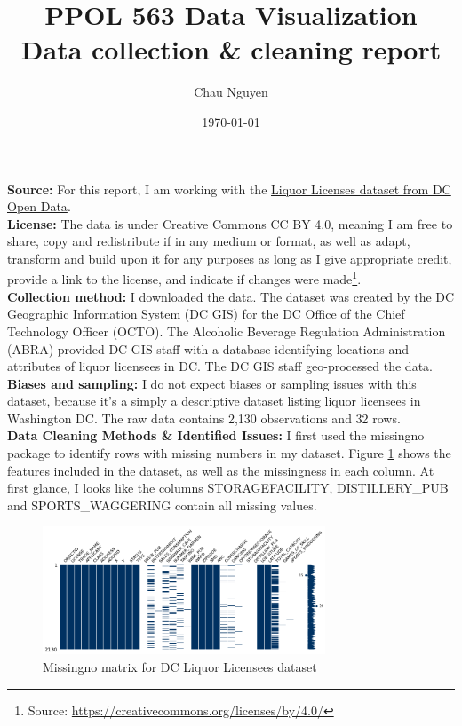 \documentclass[12pt]{article}
\title{PPOL 563 Data Visualization \\
Data collection \& cleaning report}
\author{Chau Nguyen}
\date{\today}                                           %
\begin{document}
\maketitle

\textbf{Source:}
For this report, I am working with the \href{https://opendata.dc.gov/datasets/DCGIS::liquor-licenses/about}{Liquor Licenses dataset from DC Open Data}. \\

\textbf{License:}
The data is under Creative Commons CC BY 4.0, meaning I am free to share, copy and redistribute if in any medium or format, as well as adapt, transform and build upon it for any purposes as long as I give appropriate credit, provide a link to the license, and indicate if changes were made\footnote{ Source: \url{https://creativecommons.org/licenses/by/4.0/}}. \\

\textbf{Collection method:} I downloaded the data. The dataset was created by the DC Geographic Information System (DC GIS) for the DC Office of the Chief Technology Officer (OCTO). The Alcoholic Beverage Regulation Administration (ABRA) provided DC GIS staff with a database identifying locations and attributes of liquor licensees in DC. The DC GIS staff geo-processed the data. \\

\textbf{Biases and sampling:} I do not expect biases or sampling issues with this dataset, because it's a simply a descriptive dataset listing liquor licensees in Washington DC. The raw data contains 2,130 observations and 32 rows. \\

\textbf{Data Cleaning Methods \& Identified Issues:} I first used the missingno package to identify rows with missing numbers in my dataset. Figure \ref{missing} shows the features included in the dataset, as well as the missingness in each column. At first glance, I looks like the columns STORAGEFACILITY, DISTILLERY\_PUB and SPORTS\_WAGGERING contain all missing values.

\begin{figure}[h!]
\centering
\includegraphics[width = 0.75\textwidth]{../Figures/Data_cleaning_report/missing_no.png}
\caption{Missingno matrix for DC Liquor Licensees dataset}
\label{missing}
\end{figure}
\end{document}
